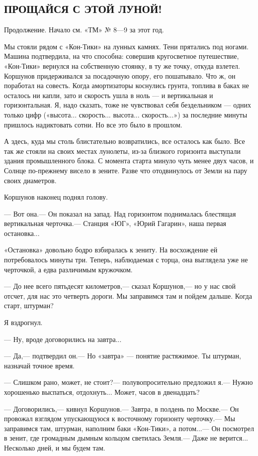 \documentclass[11pt,a4paper,oneside]{article}
\begin{document}
\subsection{ПРОЩАЙСЯ С ЭТОЙ ЛУНОЙ!}
Продолжение. Начало см. «ТМ» № 8—9 за этот год.

Мы стояли рядом с «Кон-Тики» на лунных камнях. Тени прятались под ногами. Машина подтвердила, на что способна: совершив кругосветное путешествие, «Кон-Тики» вернулся на собственную стоянку, в ту же точку, откуда взлетел. Коршунов придерживался за посадочную опору, его пошатывало. Что ж, он поработал на совесть. Когда амортизаторы коснулись грунта, топлива в баках не осталось ни капли, зато и скорость ушла в ноль — и вертикальная и горизонтальная. Я, надо сказать, тоже не чувствовал себя бездельником — одних только цифр («высота... скорость... высота... скорость...») за последние минуты пришлось надиктовать сотни. Но все это было в прошлом.

А здесь, куда мы столь блистательно возвратились, все осталось как было. Все так же стояли на своих местах лунолеты, из-за близкого горизонта выступали здания промышленного блока. С момента старта минуло чуть менее двух часов, и Солнце по-прежнему висело в зените. Разве что отодвинулось от Земли на пару своих диаметров.

Коршунов наконец поднял голову.

— Вот она.— Он показал на запад. Над горизонтом поднималась блестящая вертикальная черточка.— Станция «ЮГ», «Юрий Гагарин», наша первая остановка...

«Остановка» довольно бодро взбиралась к зениту. На восхождение ей потребовалось минуты три. Теперь, наблюдаемая с торца, она выглядела уже не черточкой, а едва различимым кружочком.

— До нее всего пятьдесят километров,— сказал Коршунов,— но у нас свой отсчет, для нас это четверть дороги. Мы заправимся там и пойдем дальше. Когда старт, штурман?

Я вздрогнул.

— Ну, вроде договорились на завтра...

— Да,— подтвердил он.— Но «завтра» — понятие растяжимое. Ты штурман, назначай точное время.

— Слишком рано, может, не стоит?— полувопросительно предложил я.— Нужно хорошенько выспаться, отдохнуть... Может, часов в двенадцать?

— Договорились,— кивнул Коршунов.— Завтра, в полдень по Москве.— Он провожал взглядом упускающуюся к восточному горизонту черточку.— Мы заправимся там, штурман, наполним баки «Кон-Тики», а потом...— Он посмотрел в зенит, где громадным дымным кольцом светилась Земля.— Даже не верится... Несколько дней, и мы будем там.
\end{document}
